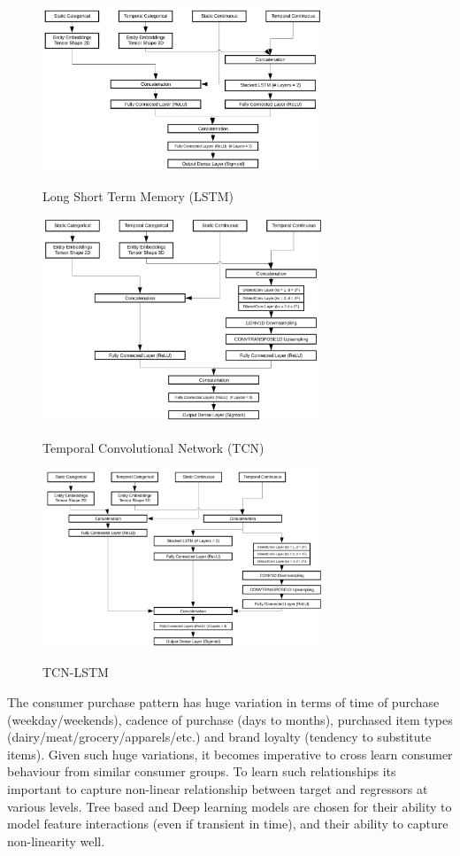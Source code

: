   \begin{figure}[t]
    \centering 
    \caption{Long Short Term Memory (LSTM)} 
    \includegraphics[width=3.3in]{img/LSTM.png} 
    \label{fig:LSTM} 
  \end{figure}
  \begin{figure}[t]
    \centering 
    \caption{Temporal Convolutional Network (TCN)} 
    \includegraphics[width=3.3in]{img/TCN.png} 
    \label{fig:TCN} 
  \end{figure}
  \begin{figure}[t]
    \centering 
    \caption{TCN-LSTM} 
    \includegraphics[width=3.3in]{img/TCNLSTM.png} 
    \label{fig:TCN-LSTM} 
  \end{figure}

The consumer purchase pattern has huge variation in terms of time of purchase (weekday/weekends), 
cadence of purchase (days to months), purchased item types (dairy/meat/grocery/apparels/etc.)
and brand loyalty (tendency to substitute items). Given such huge variations, it becomes imperative 
to cross learn consumer behaviour from similar consumer groups. To learn such relationships its 
important to capture non-linear relationship between target and regressors at various levels.
Tree based and Deep learning models are chosen for their ability to model feature interactions (even if transient in time), 
and their ability to capture non-linearity well.

